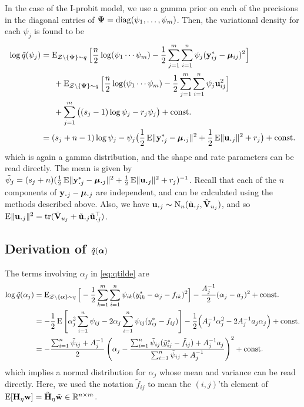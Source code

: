 In the case of the I-probit model, we use a gamma prior on each of the precisions in the diagonal entries of $\bPsi=\diag(\psi_1,\dots,\psi_m)$.
Then, the variational density for each $\psi_j$ is found to be
\begin{align*}
  \log \tilde q(\psi_j)
  &= \E_{\cZ\backslash\{\bPsi\}\sim q} \Big[ 
  \half[n]\log (\psi_1\cdots\psi_m) - \half\sum_{j=1}^m \sum_{i=1}^n \psi_j(\by^*_{ij} - \bmu_{ij})^2 
  \Big] \\
  &\phantom{==} +\E_{\cZ\backslash\{\bPsi\}\sim q} \Big[ 
  \half[n]\log (\psi_1\cdots\psi_m) - \half\sum_{j=1}^m \sum_{i=1}^n \psi_j \bu_{ij}^2 
  \Big] \\
  &\phantom{==} + \sum_{j=1}^m \big( (s_j - 1)\log \psi_j - r_j\psi_j \big) + \const \\
  &= (s_j + n - 1)\log \psi_j - \psi_j \big( \half \E\norm{\by_{\bigcdot j}^* -  \bmu_{\bigcdot j}}^2 + \half\E\norm{\bu_{\bigcdot j}}^2  + r_j \big) + \const
\end{align*}
which is again a gamma distribution, and the shape and rate parameters can be read directly.
The mean is given by $\tilde\psi_j = (s_j + n)(\half \E\norm{\by_{\bigcdot j}^* - \bmu_{\bigcdot j}}^2 + \half \E\norm{\bu_{\bigcdot j}}^2  + r_j)^{-1}$.
Recall that each of the $n$ components of $\by_{\bigcdot j} -  \bmu_{\bigcdot j}$ are independent, and can be calculated using the methods described above.
Also, we have $\bu_{\bigcdot j} \sim \N_n(\tilde\bu_{\bigcdot j}, \tilde\bV_{u_j})$, and so $  \E\norm{\bu_{\bigcdot j}}^2 = \tr(\tilde\bV_{u_j} + \tilde\bu_{\bigcdot j}\tilde\bu_{\bigcdot j}^\top)$.

\subsection{Derivation of \texorpdfstring{$\tilde q(\balpha)$}{$\tilde q(\alpha)$}}

The terms involving $\alpha_j$ in \cref{eq:qtilde} are
\begin{align*}
  \log \tilde q(\alpha_j)
  &= \E_{\cZ\backslash\{\balpha\}\sim q} \Big[ 
  -\half\sum_{k=1}^m \sum_{i=1}^n \psi_{ik}(y^*_{ik} - \alpha_j - f_{ik})^2 
  \Big] 
  - \frac{A_j^{-1}}{2} (\alpha_j - a_j)^2 + \const \\
  &= -\half\E \left[\alpha_j^2 \sum_{i=1}^n \psi_{ij}  - 2\alpha_j\sum_{i=1}^n \psi_{ij}(y^*_{ij} -  f_{ij}) \right]
  -\half\Big(A_j^{-1}\alpha_j^2 - 2A_j^{-1}a_j\alpha_j  \Big) + \const \\
  &=-\half[\sum_{i=1}^n \tilde\psi_{ij} + A_j^{-1}] \left( 
  \alpha_j - 
  \frac{\sum_{i=1}^n \tilde\psi_{ij}(\tilde y^*_{ij} -  \tilde f_{ij}) + A_j^{-1}a_j}{\sum_{i=1}^n \tilde\psi_{ij} + A_j^{-1}}  \right)^2 + \const
\end{align*}
which implies a normal distribution for $\alpha_j$ whose mean and variance can be read directly.
Here, we used the notation $\tilde f_{ij}$ to mean the $(i,j)$'th element of 
$\E[\bH_\eta\bw] = \tilde\bH_\eta \tilde \bw \in \bbR^{n\times m}$.

